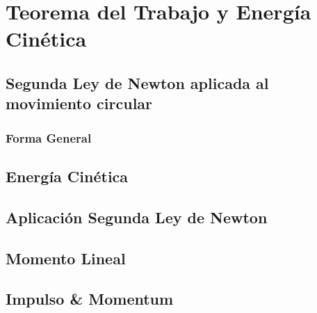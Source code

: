 \chapter{Teorema del Trabajo y Energía Cinética}

\section{Segunda Ley de Newton aplicada al movimiento circular}
\subsection{Forma General}


\newpage
\section{Energía Cinética}

\newpage
\section{Aplicación Segunda Ley de Newton}

\newpage
\section{Momento Lineal}

\newpage
\section{Impulso \& Momentum}